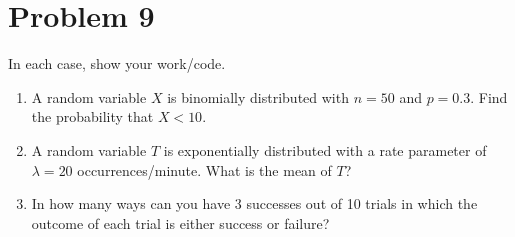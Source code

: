 \documentclass[12pt,twoside]{article}
\newcommand{\pts}[1]{\marginpar{ \small\hspace{0pt} \textit{[#1]} } }
\newcommand{\?}{\stackrel{?}{=}}
\begin{document}
\section*{Problem 9 }
In each case, show your work/code.

\begin{enumerate}[\bf (a)]
\item A random variable $X$ is binomially distributed with $n=50$ and $p=0.3$. Find the probability that $X < 10$. \pts{3}
\vspace{30ex}

\item A random variable $T$ is exponentially distributed with a rate parameter of $\lambda = 20$ occurrences/minute.\pts{2}
What is the mean of $T$? 
  \vspace{20ex}

  
\item In how many ways can you have 3 successes out of 10 trials in which the outcome of each trial is either success or failure? \pts{3}
\end{enumerate}




  
  
\end{document}
